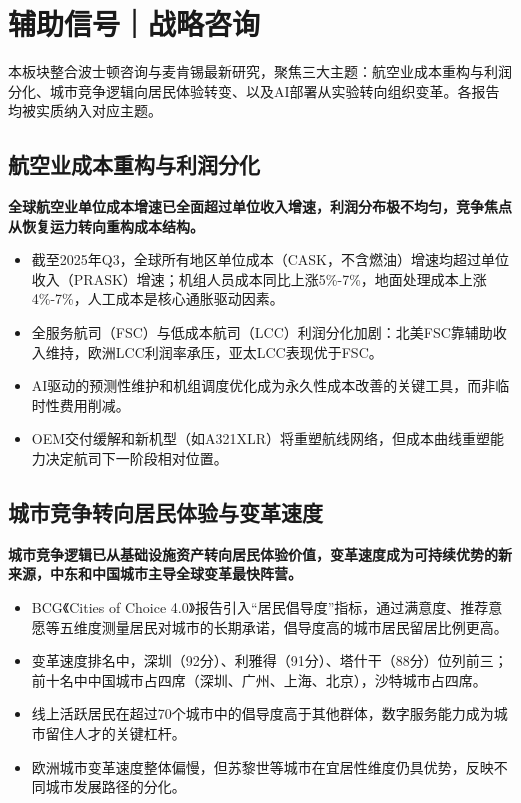 \documentclass[11pt]{ctexart}
\begin{document}
\section{辅助信号｜战略咨询}
本板块整合波士顿咨询与麦肯锡最新研究，聚焦三大主题：航空业成本重构与利润分化、城市竞争逻辑向居民体验转变、以及AI部署从实验转向组织变革。各报告均被实质纳入对应主题。
\subsection{航空业成本重构与利润分化}
\textbf{全球航空业单位成本增速已全面超过单位收入增速，利润分布极不均匀，竞争焦点从恢复运力转向重构成本结构。}
\begin{itemize}
  \item 截至2025年Q3，全球所有地区单位成本（CASK，不含燃油）增速均超过单位收入（PRASK）增速；机组人员成本同比上涨5\%-7\%，地面处理成本上涨4\%-7\%，人工成本是核心通胀驱动因素。
  \item 全服务航司（FSC）与低成本航司（LCC）利润分化加剧：北美FSC靠辅助收入维持，欧洲LCC利润率承压，亚太LCC表现优于FSC。
  \item AI驱动的预测性维护和机组调度优化成为永久性成本改善的关键工具，而非临时性费用削减。
  \item OEM交付缓解和新机型（如A321XLR）将重塑航线网络，但成本曲线重塑能力决定航司下一阶段相对位置。
\end{itemize}
\subsection{城市竞争转向居民体验与变革速度}
\textbf{城市竞争逻辑已从基础设施资产转向居民体验价值，变革速度成为可持续优势的新来源，中东和中国城市主导全球变革最快阵营。}
\begin{itemize}
  \item BCG《Cities of Choice 4.0》报告引入“居民倡导度”指标，通过满意度、推荐意愿等五维度测量居民对城市的长期承诺，倡导度高的城市居民留居比例更高。
  \item 变革速度排名中，深圳（92分）、利雅得（91分）、塔什干（88分）位列前三；前十名中中国城市占四席（深圳、广州、上海、北京），沙特城市占四席。
  \item 线上活跃居民在超过70个城市中的倡导度高于其他群体，数字服务能力成为城市留住人才的关键杠杆。
  \item 欧洲城市变革速度整体偏慢，但苏黎世等城市在宜居性维度仍具优势，反映不同城市发展路径的分化。
\end{itemize}
\end{document}
